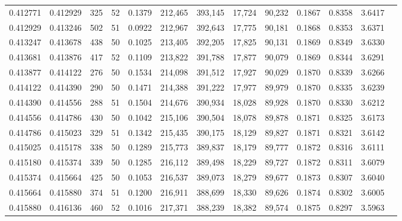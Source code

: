 \begin{tabular}{rrrrrrrrrrrrr}
0.412771 & 0.412929 &   325 &  52 &                                     0.1379 & 212,465 & 393,145 &  17,724 &  90,232 & 0.1867 & 0.8358 & 3.6417 \\
0.412929 & 0.413246 &   502 &  51 &                                     0.0922 & 212,967 & 392,643 &  17,775 &  90,181 & 0.1868 & 0.8353 & 3.6371 \\
0.413247 & 0.413678 &   438 &  50 &                                     0.1025 & 213,405 & 392,205 &  17,825 &  90,131 & 0.1869 & 0.8349 & 3.6330 \\
0.413681 & 0.413876 &   417 &  52 &                                     0.1109 & 213,822 & 391,788 &  17,877 &  90,079 & 0.1869 & 0.8344 & 3.6291 \\
0.413877 & 0.414122 &   276 &  50 &                                     0.1534 & 214,098 & 391,512 &  17,927 &  90,029 & 0.1870 & 0.8339 & 3.6266 \\
0.414122 & 0.414390 &   290 &  50 &                                     0.1471 & 214,388 & 391,222 &  17,977 &  89,979 & 0.1870 & 0.8335 & 3.6239 \\
0.414390 & 0.414556 &   288 &  51 &                                     0.1504 & 214,676 & 390,934 &  18,028 &  89,928 & 0.1870 & 0.8330 & 3.6212 \\
0.414556 & 0.414786 &   430 &  50 &                                     0.1042 & 215,106 & 390,504 &  18,078 &  89,878 & 0.1871 & 0.8325 & 3.6173 \\
0.414786 & 0.415023 &   329 &  51 &                                     0.1342 & 215,435 & 390,175 &  18,129 &  89,827 & 0.1871 & 0.8321 & 3.6142 \\
0.415025 & 0.415178 &   338 &  50 &                                     0.1289 & 215,773 & 389,837 &  18,179 &  89,777 & 0.1872 & 0.8316 & 3.6111 \\
0.415180 & 0.415374 &   339 &  50 &                                     0.1285 & 216,112 & 389,498 &  18,229 &  89,727 & 0.1872 & 0.8311 & 3.6079 \\
0.415374 & 0.415664 &   425 &  50 &                                     0.1053 & 216,537 & 389,073 &  18,279 &  89,677 & 0.1873 & 0.8307 & 3.6040 \\
0.415664 & 0.415880 &   374 &  51 &                                     0.1200 & 216,911 & 388,699 &  18,330 &  89,626 & 0.1874 & 0.8302 & 3.6005 \\
0.415880 & 0.416136 &   460 &  52 &                                     0.1016 & 217,371 & 388,239 &  18,382 &  89,574 & 0.1875 & 0.8297 & 3.5963 \\

\end{tabular}
